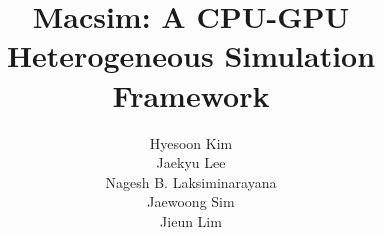 \documentclass[11pt, letterpaper]{article}
\begin{document}
\title{Macsim: A CPU-GPU Heterogeneous Simulation Framework}

\author{Hyesoon Kim\\
Jaekyu Lee\\
Nagesh B. Laksiminarayana\\
Jaewoong Sim\\
Jieun Lim}

\maketitle
\thispagestyle{empty}

\clearpage

\tableofcontents

\clearpage













\clearpage


\end{document}
